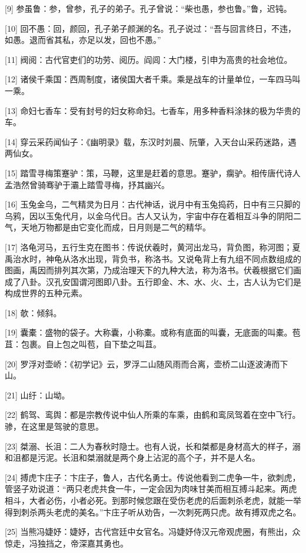 \documentclass[12pt,UTF8]{ctexbook}
\begin{document}
[9] 参虽鲁：参，曾参，孔子的弟子。孔子曾说：“柴也愚，参也鲁。”鲁，迟钝。

[10] 回不愚：回，颜回，孔子弟子颜渊的名。孔子说过：“吾与回言终日，不违，如愚。退而省其私，亦足以发，回也不愚。”

[11] 阀阅：古代官吏们的功劳、阅历。阎闾：大门楼，引申为高贵的社会地位。

[12] 诸侯千乘国：西周制度，诸侯国大者千乘。乘是战车的计量单位，一车四马叫一乘。

[13] 命妇七香车：受有封号的妇女称命妇。七香车，用多种香料涂抹的极为华贵的车。

[14] 穿云采药闻仙子：《幽明录》载，东汉时刘晨、阮肇，入天台山采药迷路，遇两仙女。

[15] 踏雪寻梅策蹇驴：策，马鞭，这里是赶着的意思。蹇驴，瘸驴。相传唐代诗人孟浩然曾骑骞驴于灞上踏雪寻梅，抒其幽兴。

[16] 玉兔金乌，二气精灵为日月：古代神话，说月中有玉兔捣药，日中有三只脚的乌鸦，因以玉兔代月，以金乌代日。古人又认为，宇宙中存在着相互斗争的阴阳二气，天地万物都是由它变化而成，日月则是二气的精华。

[17] 洛龟河马，五行生克在图书：传说伏羲时，黄河出龙马，背负图，称河图；夏禹治水时，神龟从洛水出现，背负书，称洛书。又说龟背上有九组不同点数组成的图画，禹因而排列其次第，乃成治理天下的九种大法，称为洛书。伏羲根据它们画成了八卦。汉孔安国谓河图即八卦。五行即金、木、水、火、土，古人认为它们是构成世界的五种元素。

[18] 欹：倾斜。

[19] 囊橐：盛物的袋子。大称囊，小称橐。或称有底面的叫囊，无底面的叫橐。苞苴：包裹。自上包之叫苞，自下垫之叫苴。

[20] 罗浮对壶峤：《初学记》云，罗浮二山随风雨而合离，壶桥二山逐波涛而下山。

[21] 山纡：山坳。

[22] 鹤驾、鸾舆：都是宗教传说中仙人所乘的车乘，由鹤和鸾凤驾着在空中飞行。骖，在这里是驾驶的意思。

[23] 桀溺、长沮：二人为春秋时隐士。也有人说，长和桀都是身材高大的样子，溺和沮都是污泥。长沮和桀溺就是两个身上沾泥的高个子，并不是人名。

[24] 搏虎卞庄子：卞庄子，鲁人，古代名勇士。传说他看到二虎争一牛，欲刺虎，管竖子劝说道：“两只老虎共食一牛，一定会因为肉味甘美而相互搏斗起来。两虎相斗，大者必伤，小者必死。到那时候您跟在受伤老虎的后面刺杀老虎，就能一举得到刺杀两头老虎的美名。”卞庄子听从劝告，一次刺死两只虎。故有搏双虎之名。

[25] 当熊冯婕妤：婕妤，古代宫廷中女官名。冯婕妤侍汉元帝观虎圈，有熊出，众惊走，冯独挡之，帝深嘉其勇也。
\end{document}
